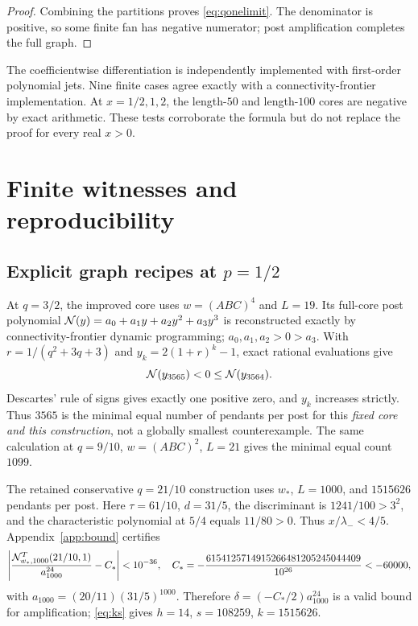 \documentclass[11pt,a4paper]{article}
\theoremstyle{remark}\newtheorem{remark}[theorem]{Remark}
\begin{document}
\begin{proof}
Combining the partitions proves \eqref{eq:qonelimit}. The denominator is positive, so some finite fan has negative numerator; post amplification completes the full graph.
\end{proof}
The coefficientwise differentiation is independently implemented with first-order polynomial jets. Nine finite cases agree exactly with a connectivity-frontier implementation. At $x=1/2,1,2$, the length-$50$ and length-$100$ cores are negative by exact arithmetic. These tests corroborate the formula but do not replace the proof for every real $x>0$.

\section{Finite witnesses and reproducibility}\label{sec:certificates}
\subsection{Explicit graph recipes at $p=1/2$}
At $q=3/2$, the improved core uses $w=(ABC)^4$ and $L=19$. Its full-core post polynomial $\mathcal N(y)=a_0+a_1y+a_2y^2+a_3y^3$ is reconstructed exactly by connectivity-frontier dynamic programming; $a_0,a_1,a_2>0>a_3$. With $r=1/(q^2+3q+3)$ and $y_k=2(1+r)^k-1$, exact rational evaluations give
\[
\mathcal N(y_{3565})<0\le\mathcal N(y_{3564}).
\]
Descartes' rule of signs gives exactly one positive zero, and $y_k$ increases strictly. Thus $3565$ is the minimal equal number of pendants per post for this \emph{fixed core and this construction}, not a globally smallest counterexample. The same calculation at $q=9/10$, $w=(ABC)^2$, $L=21$ gives the minimal equal count $1099$.

The retained conservative $q=21/10$ construction uses $w_*$, $L=1000$, and $1515626$ pendants per post. Here $\tau=61/10$, $d=31/5$, the discriminant is $1241/100>3^2$, and the characteristic polynomial at $5/4$ equals $11/80>0$. Thus $x/\lambda_-<4/5$. Appendix~\ref{app:bound} certifies
\begin{equation}\label{eq:finitegap}
\left|\frac{\mathcal N^T_{w_*,1000}(21/10,1)}{a_{1000}^{24}}-C_*\right|<10^{-36},
\quad C_*=-\frac{6154125714915266481205245044409}{10^{26}}<-60000,
\end{equation}
with $a_{1000}=(20/11)(31/5)^{1000}$. Therefore $\delta=(-C_*/2)a_{1000}^{24}$ is a valid bound for amplification; \eqref{eq:ks} gives $h=14$, $s=108259$, $k=1515626$.
\end{document}
